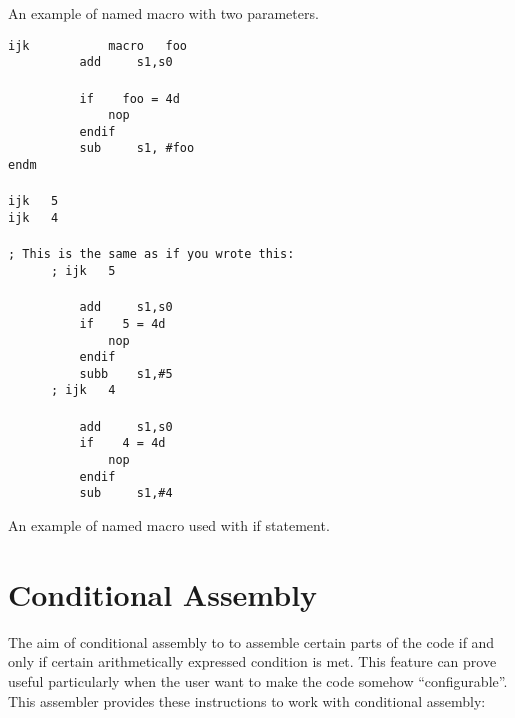         An example of named macro with two parameters.

        {
            \usecodefont
            \verb'ijk           macro   foo'\\
            \verb'          add     s1,s0'\\
            \verb''\\
            \verb'          if    foo = 4d'\\
            \verb'              nop'\\
            \verb'          endif'\\
            \verb'          sub     s1, #foo'\\
            \verb'endm'\\\\
            \verb'ijk   5'\\
            \verb'ijk   4'\\\\
            \verb'; This is the same as if you wrote this:'\\
            \verb'      ; ijk   5'\\\\
            \verb'          add     s1,s0'\\
            \verb'          if    5 = 4d'\\
            \verb'              nop'\\
            \verb'          endif'\\
            \verb'          subb    s1,#5'\\
            \verb'      ; ijk   4'\\\\
            \verb'          add     s1,s0'\\
            \verb'          if    4 = 4d'\\
            \verb'              nop'\\
            \verb'          endif'\\
            \verb'          sub     s1,#4'\\
        }

        An example of named macro used with if statement.

\section{Conditional Assembly}
    The aim of conditional assembly to to assemble certain parts of the code if and only if certain arithmetically expressed condition is met. This feature can prove useful particularly when the user want to make the code somehow ``configurable''. This assembler provides these instructions to work with conditional assembly:

